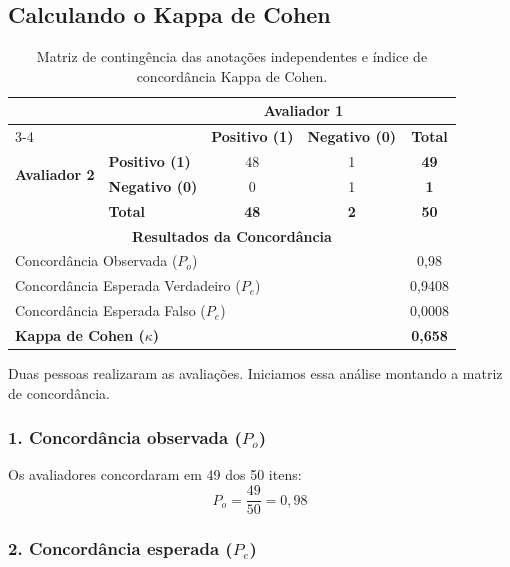 \documentclass{IEEEtran}
\begin{document}
\subsection{Calculando o Kappa de Cohen}

\begin{table}[htbp]
  \centering
  \caption{Matriz de contingência das anotações independentes e índice de concordância Kappa de Cohen.}
  \label{tab:kappa_contingencia}
  \renewcommand{\arraystretch}{1.3} 
  \begin{tabular}{llccc}
    \toprule
    & & \multicolumn{2}{c}{\textbf{Avaliador 1}} & \\
    \cmidrule(lr){3-4}
    & & \textbf{Positivo (1)} & \textbf{Negativo (0)} & \textbf{Total} \\
    \midrule
    \multirow{2}{*}{\textbf{Avaliador 2}} 
    & \textbf{Positivo (1)} & 48 & 1  & \textbf{49} \\
    & \textbf{Negativo (0)} & 0  & 1 & \textbf{1} \\
    \midrule
    & \textbf{Total}        & \textbf{48} & \textbf{2} & \textbf{50} \\
    \bottomrule
    \multicolumn{5}{c}{\textbf{Resultados da Concordância}} \\
    \midrule
    \multicolumn{4}{l}{Concordância Observada ($P_o$)} & 0,98 \\
    \multicolumn{4}{l}{Concordância Esperada Verdadeiro ($P_e$)}  & 0,9408 \\
    \multicolumn{4}{l}{Concordância Esperada Falso ($P_e$)}  & 0,0008 \\
    \multicolumn{4}{l}{\textbf{Kappa de Cohen ($\kappa$)}} & \textbf{0,658} \\
    \bottomrule
  \end{tabular}
\end{table}

Duas pessoas realizaram as avaliações. Iniciamos essa análise montando a matriz de concordância.

\subsubsection*{1. Concordância observada ($P_o$)}

Os avaliadores concordaram em 49 dos 50 itens:
$$P_o = \frac{49}{50} = 0{,}98$$

\subsubsection*{2. Concordância esperada ($P_e$)}
\end{document}
